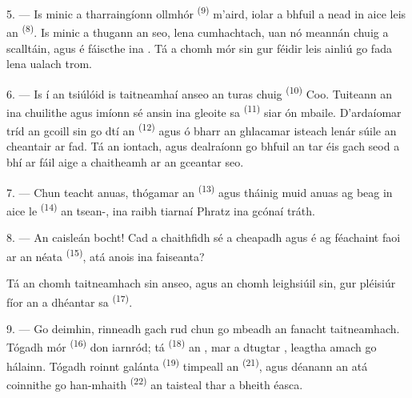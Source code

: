5. --- Is minic a tharraingíonn  ollmhór \textsuperscript{(9)} m'aird,
iolar a bhfuil a nead in aice leis an  \textsuperscript{(8)}. Is minic
a thugann an  seo, lena  cumhachtach, uan nó
meannán chuig a scalltáin, agus é fáiscthe ina . Tá a
 chomh mór sin gur féidir leis ainliú go fada lena ualach trom.

\VUsaut{3.0mm}
\VUsaut{3.0mm}

6. --- Is í an tsiúlóid is taitneamhaí anseo an turas chuig 
\textsuperscript{(10)} Coo. Tuiteann an  ina chuilithe agus
imíonn sé ansin ina  gleoite sa 
\textsuperscript{(11)} siar ón mbaile. D'ardaíomar tríd an gcoill sin go dtí an
 \textsuperscript{(12)} agus ó bharr an
 ghlacamar isteach lenár súile  an cheantair ar
fad. Tá an  iontach, agus dealraíonn go bhfuil an
 tar éis gach seod a bhí ar fáil aige a chaitheamh ar an gceantar
seo.

7. --- Chun teacht anuas, thógamar an 
\textsuperscript{(13)} agus tháinig muid anuas ag  beag in aice le
 \textsuperscript{(14)} an tsean-,
ina raibh tiarnaí Phratz ina gcónaí tráth.

8. --- An caisleán bocht! Cad a chaithfidh sé a cheapadh agus é ag féachaint faoi ar
an  néata \textsuperscript{(15)}, atá anois ina
 faiseanta?

Tá an  chomh taitneamhach sin anseo, agus an  chomh leighsiúil sin, gur pléisiúr fíor an  a
dhéantar sa  \textsuperscript{(17)}.

\VUsaut{3.0mm}
\VUsaut{3.0mm}

9. --- Go deimhin, rinneadh gach rud chun go mbeadh an fanacht taitneamhach. Tógadh
 mór \textsuperscript{(16)} don iarnród; tá 
\textsuperscript{(18)} an , mar a dtugtar ,
leagtha amach go hálainn. Tógadh roinnt  galánta
\textsuperscript{(19)} timpeall an  \textsuperscript{(21)}, agus
déanann an  atá coinnithe go han-mhaith \textsuperscript{(22)} an
taisteal thar a bheith éasca.

